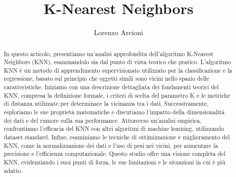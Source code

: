 \documentclass{article}
\title{K-Nearest Neighbors}
\author{Lorenzo Arcioni}
\begin{document}


\maketitle

\begin{abstract}
    In questo articolo, presentiamo un'analisi approfondita dell'algoritmo K-Nearest Neighbors (KNN), 
    esaminandolo sia dal punto di vista teorico che pratico. L'algoritmo KNN è un metodo di 
    apprendimento supervisionato utilizzato per la classificazione e la regressione, basato sul 
    principio che oggetti simili sono vicini nello spazio delle caratteristiche. Iniziamo con una 
    descrizione dettagliata dei fondamenti teorici del KNN, compresa la definizione formale, 
    i criteri di scelta del parametro K e le metriche di distanza utilizzate per determinare la 
    vicinanza tra i dati. Successivamente, esploriamo le sue proprietà matematiche e discutiamo l'impatto 
    della dimensionalità dei dati e del rumore sulla sua performance. Attraverso un'analisi empirica, 
    confrontiamo l'efficacia del KNN con altri algoritmi di machine learning, utilizzando dataset 
    standard. Infine, esaminiamo le tecniche di ottimizzazione e miglioramento del KNN, come 
    la normalizzazione dei dati e l'uso di pesi nei vicini, per aumentare la precisione e l'efficienza 
    computazionale. Questo studio offre una visione completa del KNN, evidenziando i suoi punti di forza, 
    le sue limitazioni e le situazioni in cui è più adatto. 
\end{abstract}

\tableofcontents






\nocite{*}


\end{document}
